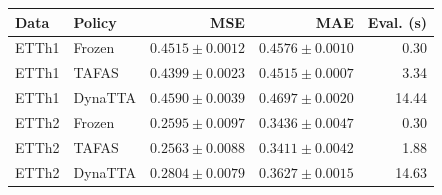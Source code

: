 \begin{tabular}{llrrr}
\toprule
Data & Policy & MSE & MAE & Eval. (s) \\
\midrule
ETTh1 & Frozen & $0.4515\pm0.0012$ & $0.4576\pm0.0010$ & 0.30 \\
ETTh1 & TAFAS & $0.4399\pm0.0023$ & $0.4515\pm0.0007$ & 3.34 \\
ETTh1 & DynaTTA & $0.4590\pm0.0039$ & $0.4697\pm0.0020$ & 14.44 \\
ETTh2 & Frozen & $0.2595\pm0.0097$ & $0.3436\pm0.0047$ & 0.30 \\
ETTh2 & TAFAS & $0.2563\pm0.0088$ & $0.3411\pm0.0042$ & 1.88 \\
ETTh2 & DynaTTA & $0.2804\pm0.0079$ & $0.3627\pm0.0015$ & 14.63 \\
\bottomrule
\end{tabular}
